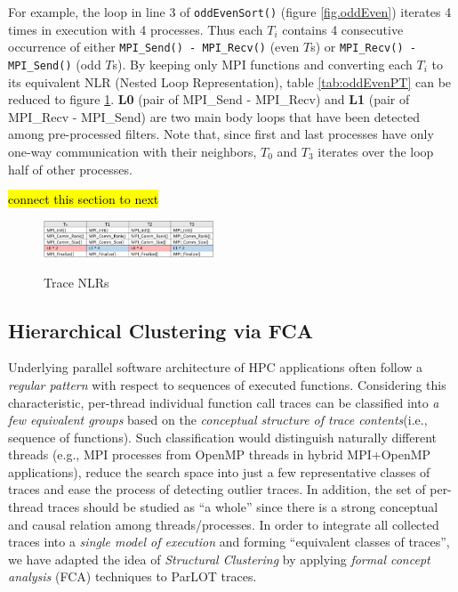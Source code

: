 For example, the loop in line 3 of \texttt{oddEvenSort()} (figure \ref{fig.oddEven}) iterates 4 times in execution with 4 processes. Thus each $T_i$ contains 4 consecutive occurrence of either \texttt{MPI\_Send() - MPI\_Recv()} (even $T$s) or \texttt{MPI\_Recv() - MPI\_Send()} (odd $T$s). By keeping only MPI functions and converting each $T_i$ to its equivalent NLR (Nested Loop Representation), table \ref{tab:oddEvenPT} can be reduced to figure \ref{tab:oddEvenPT-r}. \textbf{L0} (pair of MPI\_Send - MPI\_Recv) and \textbf{L1} (pair of MPI\_Recv - MPI\_Send) are two main body loops that have been detected among pre-processed filters. Note that, since first and last processes have only one-way communication with their neighbors, $T_0$ and $T_3$ iterates over the loop half of other processes.

\hl{connect this section to next}

\begin{figure}[]
\centering
\caption{Trace NLRs}
\includegraphics[width=0.45\textwidth]{figs/oddEvenPT-r.png}
\label{tab:oddEvenPT-r}
\end{figure}


\subsection{Hierarchical Clustering via FCA}
Underlying parallel software architecture of HPC applications often follow a \textit{regular pattern} with respect to sequences of executed functions. 
%
Considering this characteristic, per-thread individual function call traces can be classified into \textit{a few equivalent groups} based on the \textit{conceptual structure of trace contents}(i.e., sequence of functions).
% 
Such classification would distinguish naturally different threads (e.g., MPI processes from OpenMP threads in hybrid MPI+OpenMP applications), reduce the search space into just a few representative classes of traces and ease the process of detecting outlier traces.
%
In addition, the set of per-thread traces should be studied as ``a whole'' since there is a strong conceptual and causal relation among threads/processes.
%
In order to integrate all collected traces into a \textit{single model of execution} and forming ``equivalent classes of traces'', we have adapted the idea of \textit{Structural Clustering}  \cite{weberStructural} by applying \textit{formal concept analysis} (FCA)\cite{clbook} techniques to ParLOT traces.
%

